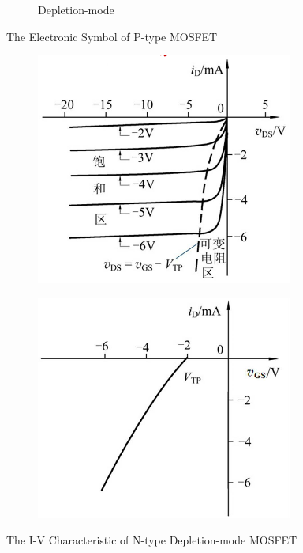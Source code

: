 \begin{figure}[H]
\begin{subfigure}{.3\textwidth}
    \caption{Depletion-mode}
    \label{fig:}
  \end{subfigure}
  \caption{The Electronic Symbol of P-type MOSFET}
  \label{fig:}
\end{figure}

\begin{figure}[H]
  \centering
  \begin{subfigure}{.3\textwidth}
    \centering
    \includegraphics[width=\linewidth]{figures/PMOSIV1}
    \label{fig:}
  \end{subfigure}%
  \begin{subfigure}{.3\textwidth}
    \centering
    \includegraphics[width=\linewidth]{figures/PMOSIV2}
    \label{fig:}
  \end{subfigure}
  \caption{The I-V Characteristic of N-type Depletion-mode MOSFET}
  \label{fig:}
\end{figure}





